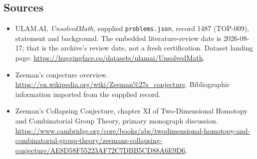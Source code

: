 \documentclass[11pt,a4paper]{article}
\begin{document}
\subsection{Sources}

{\small

\begin{itemize}

\item[\hypertarget{source:1487:1}{S1}] ULAM.AI, \emph{UnsolvedMath}, supplied \texttt{problems.json}, record 1487 (TOP-009), statement and background. The embedded literature-review date is 2026-08-17; that is the archive’s review date, not a fresh certification. Dataset landing page: \url{https://huggingface.co/datasets/ulamai/UnsolvedMath}.

\item[\hypertarget{source:1487:2}{S2}] Zeeman's conjecture overview. \url{https://en.wikipedia.org/wiki/Zeeman%27s_conjecture}. Bibliographic information imported from the supplied record.

\item[R1] Zeeman’s Collapsing Conjecture, chapter XI of Two-Dimensional Homotopy and Combinatorial Group Theory, primary monograph discussion.
\url{https://www.cambridge.org/core/books/abs/twodimensional-homotopy-and-combinatorial-group-theory/zeemans-collapsing-conjecture/AE8D58F55223AF72C7DBB5CD88A6E9D6}.
\end{itemize}

}

\label{end:1487}
\end{document}
